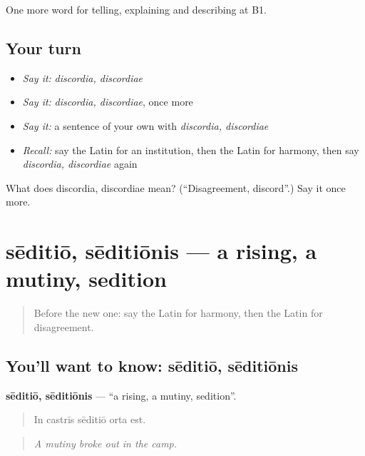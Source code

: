 \begin{grammarlens}[title={What you've built}]
One more word for telling, explaining and describing at B1.
\end{grammarlens}

\subsection*{Your turn}
\begin{itemize}
\raggedright
  \item \emph{Say it:} \emph{discordia, discordiae}
  \item \emph{Say it:} \emph{discordia, discordiae}, once more
  \item \emph{Say it:} a sentence of your own with \emph{discordia, discordiae}
  \item \emph{Recall:} say the Latin for an institution, then the Latin for harmony, then say \emph{discordia, discordiae} again
\end{itemize}

\begin{tcolorbox}[breakable,colback=teal!4,colframe=teal!35!black,title={Before you move on}]
What does discordia, discordiae mean? (\textquotedblleft{}Disagreement, discord\textquotedblright{}.) Say it once more.
\end{tcolorbox}
\section[sēditiō, sēditiōnis]{sēditiō, sēditiōnis — a rising, a mutiny, sedition}

\label{lesson:LA-C387-seditio}



\begin{quote}
Before the new one: say the Latin for harmony, then the Latin for disagreement.
\end{quote}

\subsection*{You'll want to know: sēditiō, sēditiōnis}
\textbf{sēditiō, sēditiōnis} — \textquotedblleft{}a rising, a mutiny, sedition\textquotedblright{}.

\begin{quote}
In castrīs sēditiō orta est.
\end{quote}

\begin{quote}
\emph{A mutiny broke out in the camp.}
\end{quote}

